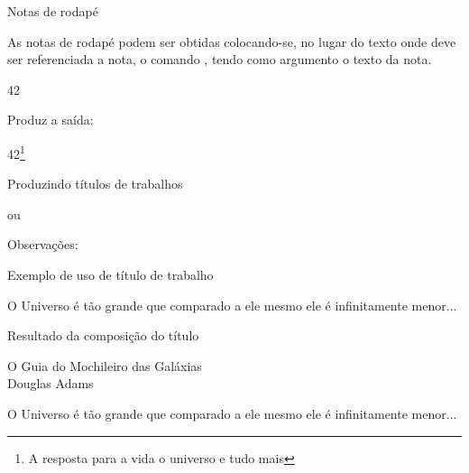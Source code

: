 \begin{frame}{Notas de rodapé}


As notas de rodapé podem ser obtidas colocando-se, no lugar do 
texto onde deve ser referenciada a nota, o comando , tendo como argumento o texto da nota. 

\begin{LaTeXcode}[Exemplo]
42
\end{LaTeXcode}

Produz a saída:
\begin{LaTeXoutput}
42\footnote{A resposta para a vida o universo e tudo mais}
\end{LaTeXoutput}
\end{frame}

\begin{frame}{Produzindo títulos de trabalhos}
\begin{LaTeXcode}[Declarações]
\n
{}\n
{} ou 
\end{LaTeXcode}

Observações:

\begin{LaTeXcode}[Produzindo]
\end{LaTeXcode}
\end{frame}

\begin{frame}{Exemplo de uso de título de trabalho}
\begin{LaTeXcode}
\n
{}\n
{}\n
{}\n
{}\n
{}\n

O Universo é tão grande que comparado a ele mesmo ele é infinitamente menor...
\end{LaTeXcode}
\end{frame}

\begin{frame}{Resultado da composição do título}
\begin{LaTeXoutput}
{\centering
{\Large O Guia do Mochileiro das Galáxias}\\[\baselineskip]
{Douglas Adams}\par}

\vspace{4\baselineskip}

O Universo é tão grande que comparado a ele mesmo ele é infinitamente menor...
\end{LaTeXoutput}
\end{frame}

